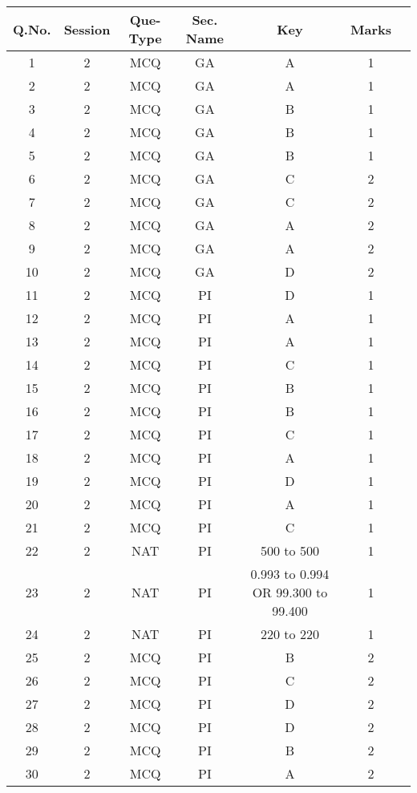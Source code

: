 \begin{table}[h]
\begin{center}
\begin{tabular}{|c|c|c|c|c|c|c|}
\hline
Q.No. & Session & Que-Type & Sec. Name & Key & Marks \\
\hline
1 & 2 & MCQ & GA & A & 1 \\
\hline
2 & 2 & MCQ & GA & A & 1 \\
\hline
3 & 2 & MCQ & GA & B & 1 \\
\hline
4 & 2 & MCQ & GA & B & 1 \\
\hline
5 & 2 & MCQ & GA & B & 1 \\
\hline
6 & 2 & MCQ & GA & C & 2 \\
\hline
7 & 2 & MCQ & GA & C & 2 \\
\hline
8 & 2 & MCQ & GA & A & 2 \\
\hline
9 & 2 & MCQ & GA & A & 2 \\
\hline
10 & 2 & MCQ & GA & D & 2 \\
\hline
11 & 2 & MCQ & PI & D & 1 \\
\hline
12 & 2 & MCQ & PI & A & 1 \\
\hline
13 & 2 & MCQ & PI & A & 1 \\
\hline
14 & 2 & MCQ & PI & C & 1 \\
\hline
15 & 2 & MCQ & PI & B & 1 \\
\hline
16 & 2 & MCQ & PI & B & 1 \\
\hline
17 & 2 & MCQ & PI & C & 1 \\
\hline
18 & 2 & MCQ & PI & A & 1 \\
\hline
19 & 2 & MCQ & PI & D & 1 \\
\hline
20 & 2 & MCQ & PI & A & 1 \\
\hline
21 & 2 & MCQ & PI & C & 1 \\
\hline
22 & 2 & NAT & PI & 500 to 500 & 1 \\
\hline
23 & 2 & NAT & PI & 0.993 to 0.994 OR 99.300 to 99.400 & 1 \\
\hline
24 & 2 & NAT & PI & 220 to 220 & 1 \\
\hline
25 & 2 & MCQ & PI & B & 2 \\
\hline
26 & 2 & MCQ & PI & C & 2 \\
\hline
27 & 2 & MCQ & PI & D & 2 \\
\hline
28 & 2 & MCQ & PI & D & 2 \\
\hline
29 & 2 & MCQ & PI & B & 2 \\
\hline
30 & 2 & MCQ & PI & A & 2 \\

\end{tabular}
\end{center}
\end{table}
